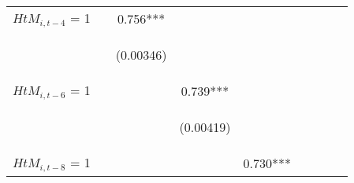 \begin{center}
\begin{tabular}{lcccccccc}
$ {HtM}_{i, t-4} $ = 1 &  & 0.756*** &  &  &  &  &  &  \\
\vspace{4pt} & \begin{footnotesize}\end{footnotesize} & \begin{footnotesize}(0.00346)\end{footnotesize} & \begin{footnotesize}\end{footnotesize} & \begin{footnotesize}\end{footnotesize} & \begin{footnotesize}\end{footnotesize} & \begin{footnotesize}\end{footnotesize} & \begin{footnotesize}\end{footnotesize} & \begin{footnotesize}\end{footnotesize} \\
$ {HtM}_{i, t-6} $ = 1 &  &  & 0.739*** &  &  &  &  &  \\
\vspace{4pt} & \begin{footnotesize}\end{footnotesize} & \begin{footnotesize}\end{footnotesize} & \begin{footnotesize}(0.00419)\end{footnotesize} & \begin{footnotesize}\end{footnotesize} & \begin{footnotesize}\end{footnotesize} & \begin{footnotesize}\end{footnotesize} & \begin{footnotesize}\end{footnotesize} & \begin{footnotesize}\end{footnotesize} \\
$ {HtM}_{i, t-8} $ = 1 &  &  &  & 0.730*** &  &  &  &  \\

\end{tabular}
\end{center}
